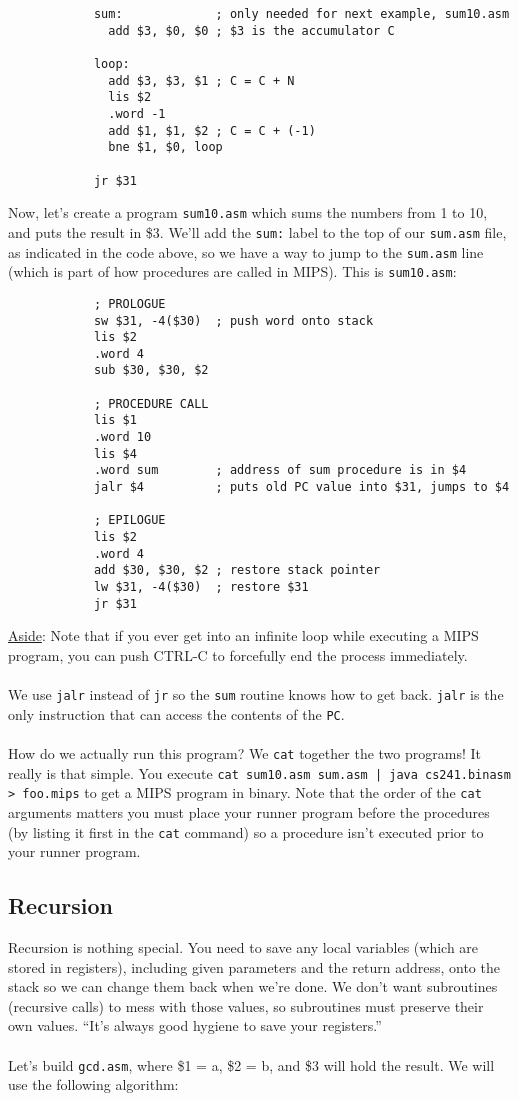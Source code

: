 \documentclass[]{article}
\theoremstyle{definition}
\begin{document}
		\begin{verbatim}
			sum:             ; only needed for next example, sum10.asm
			  add $3, $0, $0 ; $3 is the accumulator C

			loop:
			  add $3, $3, $1 ; C = C + N
			  lis $2
			  .word -1
			  add $1, $1, $2 ; C = C + (-1)
			  bne $1, $0, loop

			jr $31
		\end{verbatim}

		Now, let's create a program \verb+sum10.asm+ which sums the numbers from 1 to 10, and puts the result in \$3. We'll add the \verb+sum:+ label to the top of our \verb+sum.asm+ file, as indicated in the code above, so we have a way to jump to the \verb+sum.asm+ line (which is part of how procedures are called in MIPS). This is \verb+sum10.asm+:
		
		\begin{verbatim}
			; PROLOGUE
			sw $31, -4($30)  ; push word onto stack
			lis $2
			.word 4
			sub $30, $30, $2
			
			; PROCEDURE CALL
			lis $1
			.word 10
			lis $4
			.word sum        ; address of sum procedure is in $4
			jalr $4          ; puts old PC value into $31, jumps to $4

			; EPILOGUE
			lis $2
			.word 4
			add $30, $30, $2 ; restore stack pointer 
			lw $31, -4($30)  ; restore $31
			jr $31
		\end{verbatim}

		\underline{Aside}: Note that if you ever get into an infinite loop while executing a MIPS program, you can push CTRL-C to forcefully end the process immediately.
		\\ \\
		We use \verb+jalr+ instead of \verb+jr+ so the \verb+sum+ routine knows how to get back. \verb+jalr+ is the only instruction that can access the contents of the \verb+PC+.
		\\ \\
		How do we actually run this program? We \verb+cat+ together the two programs! It really is that simple. You execute \verb+cat sum10.asm sum.asm | java cs241.binasm > foo.mips+ to get a MIPS program in binary. Note that the order of the \verb+cat+ arguments matters \textendash{} you must place your runner program before the procedures (by listing it first in the \verb+cat+ command) so a procedure isn't executed prior to your runner program.

		\subsection{Recursion}
			Recursion is nothing special. You need to save any local variables (which are stored in registers), including given parameters and the return address, onto the stack so we can change them back when we're done. We don't want subroutines (recursive calls) to mess with those values, so subroutines must preserve their own values. ``It's always good hygiene to save your registers.''
			\\ \\
			Let's build \verb+gcd.asm+, where \$1 = a, \$2 = b, and \$3 will hold the result. We will use the following algorithm:
\end{document}

